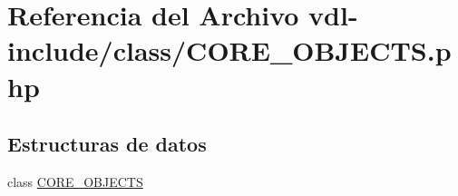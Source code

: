 \hypertarget{CORE__OBJECTS_8php}{\section{Referencia del Archivo vdl-\/include/class/\-C\-O\-R\-E\-\_\-\-O\-B\-J\-E\-C\-T\-S.php}
\label{CORE__OBJECTS_8php}
}
\subsection*{Estructuras de datos}
\begin{DoxyCompactItemize}
\item 
class \hyperlink{classCORE__OBJECTS}{C\-O\-R\-E\-\_\-\-O\-B\-J\-E\-C\-T\-S}
\end{DoxyCompactItemize}
